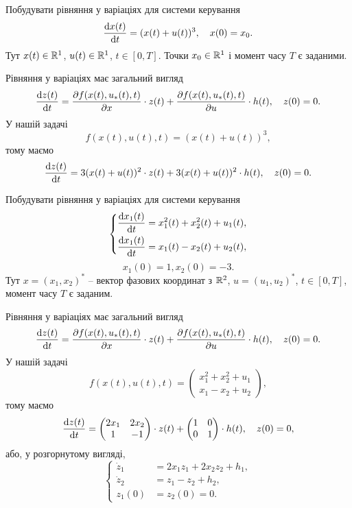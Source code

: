 \begin{problem}
	Побудувати рівняння у варіаціях для системи керування \[ \frac{\mathop{}\!\mathrm{d} x(t)}{\mathop{}\!\mathrm{d} t} = (x(t)+u(t))^3, \quad x(0) = x_0. \] Тут $x(t)\in\mathbb{R}^1$, $u(t)\in\mathbb{R}^1$, $t\in[0,T]$. Точки $x_0\in\mathbb{R}^1$ і момент часу $T$ є заданими.
\end{problem}

\begin{solution}
	Рівняння у варіаціях має загальний вигляд \[ \frac{\mathop{}\!\mathrm{d} z(t)}{\mathop{}\!\mathrm{d} t} = \frac{\partial f(x(t),u_*(t),t)}{\partial x} \cdot z(t) + \frac{\partial f(x(t),u_*(t),t)}{\partial u} \cdot h(t), \quad z(0) = 0. \] У нашій задачі \[f(x(t), u(t), t) = (x(t) + u(t))^3, \] тому маємо \[ \frac{\mathop{}\!\mathrm{d} z(t)}{\mathop{}\!\mathrm{d} t} = 3 (x(t) + u(t))^2 \cdot z(t) + 3 (x(t) + u(t))^2 \cdot h(t), \quad z(0) = 0. \]
\end{solution}

\begin{problem}
	Побудувати рівняння у варіаціях для системи керування \[ \left\{ \begin{aligned}
		\frac{\mathop{}\!\mathrm{d} x_1(t)}{\mathop{}\!\mathrm{d} t} &= x_1^2(t) + x_2^2(t) + u_1(t), \\
		\frac{\mathop{}\!\mathrm{d} x_1(t)}{\mathop{}\!\mathrm{d} t} &= x_1(t) - x_2(t) + u_2(t),
	\end{aligned} \right. \]
	\[ x_1(0) = 1, x_2(0) = -3. \]
	Тут $x = (x_1, x_2)^*$ -- вектор фазових координат з $\mathbb{R}^2$, $u = (u_1, u_2)^*$, $t\in[0, T]$, момент часу $T$ є заданим.
\end{problem}

\begin{solution}
	Рівняння у варіаціях має загальний вигляд \[ \frac{\mathop{}\!\mathrm{d} z(t)}{\mathop{}\!\mathrm{d} t} = \frac{\partial f(x(t),u_*(t),t)}{\partial x} \cdot z(t) + \frac{\partial f(x(t),u_*(t),t)}{\partial u} \cdot h(t), \quad z(0) = 0. \] У нашій задачі \[f(x(t), u(t), t) = \begin{pmatrix} x_1^2 + x_2^2 + u_1 \\ x_1 - x_2 + u_2 \end{pmatrix}, \] тому маємо \[ \frac{\mathop{}\!\mathrm{d} z(t)}{\mathop{}\!\mathrm{d} t} = \begin{pmatrix} 2 x_1 & 2 x_2 \\ 1 & -1 \end{pmatrix} \cdot z(t) + \begin{pmatrix} 1 & 0 \\ 0 & 1 \end{pmatrix} \cdot h(t), \quad z(0) = 0, \] або, у розгорнутому вигляді, \[ \left\{ \begin{aligned}
		\dot z_1 &= 2 x_1 z_1 + 2 x_2 z_2 + h_1, \\
		\dot z_2 &= z_1 - z_2 + h_2, \\
		z_1(0) &= z_2(0) = 0.
	\end{aligned} \right. \]
\end{solution}

